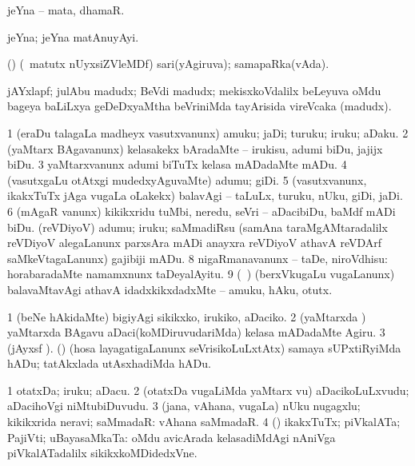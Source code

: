 \bentry
{}
\gl{\nA}
\bmng
jeYna -- mata, dhamaR. 
\emng
\eentry

\bentry
{}
\gl{\nA}
\bmng
jeYna; jeYna matAnuyAyi. 
\emng
\eentry

\bentry
{}
\gl{\gu}
\bmng
(\ashi) (\AseTxrXV\ matutx nUyxsiZVleMDf) sari(yAgiruva); samapaRka(vAda). 
\emng
\eentry

\bentry
{}
\gl{\nA}
\bmng
jAYxlapf; julAbu madudx; BeVdi madudx; mekisxkoVdalilx beLeyuva oMdu bageya baLiLxya geDeDxyaMtha beVriniMda tayArisida vireVcaka (madudx). 
\emng
\eentry

\bentry
{}
\gl{\kirx}
\bmng
\emng

\noindent
\gl{\sakirx}
\bmng
\bnum
\num{1} (eraDu talagaLa madheyx vasutxvanunx) amuku; jaDi; turuku; iruku; aDaku. 
\num{2} (yaMtarx BAgavanunx) kelasakekx bAradaMte -- irukisu, adumi biDu, jajijx biDu. 
\num{3} yaMtarxvanunx adumi biTuTx kelasa mADadaMte mADu. 
\num{4} (vasutxgaLu otAtxgi mudedxyAguvaMte) adumu; giDi. 
\num{5} (vasutxvanunx, ikakxTuTx jAga \mo vugaLa oLakekx) balavAgi -- taLuLx, turuku, nUku, giDi, jaDi. 
\num{6} (mAgaR \mo vanunx) kikikxridu tuMbi, neredu, seVri -- aDacibiDu, baMdf mADi biDu.  (reVDiyoV) adumu; iruku; saMmadiRsu (samAna taraMgAMtaradalilx reVDiyoV alegaLanunx parxsAra mADi anayxra reVDiyoV athavA reVDArf saMkeVtagaLanunx) gajibiji mADu. 
\num{8} nigaRmanavanunx -- taDe, niroVdhisu:  horabaradaMte namamxnunx taDeyalAyitu. 
\num{9} (\sA\ ) (berxVkugaLu \mo vugaLanunx) balavaMtavAgi athavA idadxkikxdadxMte -- amuku, hAku, otutx. 
\enum
\emng

\noindent
\gl{\akirx}
\bmng
\bnum
\num{1} (beNe hAkidaMte) bigiyAgi sikikxko, irukiko, aDaciko. 
\num{2} (yaMtarxda \vi) yaMtarxda BAgavu aDaci(koMDiruvudariMda) kelasa mADadaMte Agiru. 
\num{3} (jAyxsf \saM). (\AmA) (hosa layagatigaLanunx seVrisikoLuLxtAtx) samaya sUPxtiRyiMda hADu; tatAkxlada utAsxhadiMda hADu. 
\enum
\emng
\eentry

\bentry
{}
\gl{\nA}
\bmng
\bnum
\num{1} otatxDa; iruku; aDacu. 
\num{2} (otatxDa \mo vugaLiMda yaMtarx \mo vu) aDacikoLuLxvudu; aDacihoVgi niMtubiDuvudu. 
\num{3} (jana, vAhana, \mo vugaLa) nUku nugagxlu; kikikxrida neravi; saMmadaR:  vAhana saMmadaR. 
\num{4} (\AmA) ikakxTuTx; piVkalATa; PajiVti; uBayasaMkaTa:  oMdu avicArada kelasadiMdAgi nAniVga piVkalATadalilx sikikxkoMDidedxVne. 
\enum
\emng
\eentry

